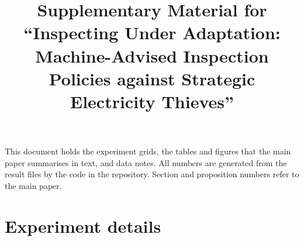 \documentclass[11pt]{article}
\begin{document}
\title{Supplementary Material for\\ ``Inspecting Under Adaptation: Machine-Advised Inspection Policies against Strategic Electricity Thieves''}
\author{}
\date{}
\maketitle

\noindent This document holds the experiment grids, the tables and figures that the main paper summarises in text, and data notes. All numbers are generated from the result files by the code in the repository. Section and proposition numbers refer to the main paper.

\section{Experiment details}
\end{document}
